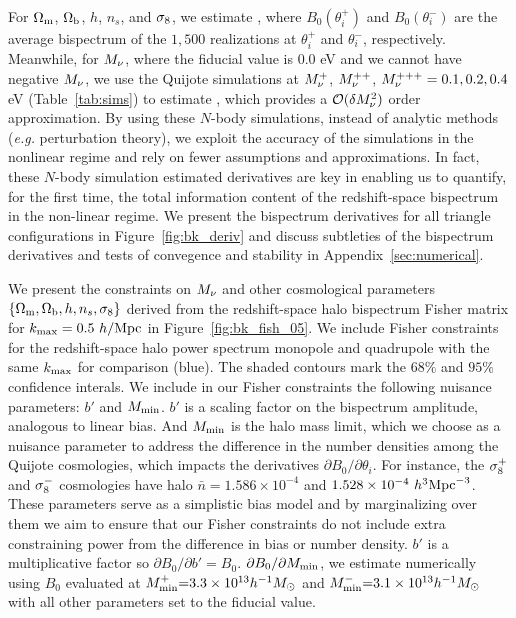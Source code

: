 For $\Omega_{\rm m}$, $\Omega_{\rm b}$, $h$, $n_s$, and $\sigma_8$, we estimate 
\beq \label{eq:dbkdt} 
 \approx {}, 
\eeq
where $B_0(\theta_i^{+})$ and $B_0(\theta_i^{-})$ are the average bispectrum of the 
$1,500$ realizations at $\theta_i^{+}$ and $\theta_i^{-}$, 
respectively. Meanwhile, for $M_\nu$, where the fiducial value is 0.0 eV and we 
cannot have negative $M_\nu$, we use the Quijote simulations at $M_\nu^+$, 
$M_\nu^{++}$, 
$M_\nu^{+++}=0.1, 0.2, 0.4$ eV (Table~\ref{tab:sims}) to estimate 
\beq \label{eq:dbkdmnu} 
 \approx {}, 
\eeq
which provides a $\mathcal{O}(\delta M_\nu^2)$ order approximation. By using these 
$N$-body simulations, instead of analytic methods (\emph{e.g.} perturbation theory), 
we exploit the accuracy of the simulations in the nonlinear regime and rely on fewer 
assumptions and approximations. In fact, these $N$-body simulation estimated 
derivatives are key in enabling us to quantify, for the first time, the total information 
content of the redshift-space bispectrum in the non-linear regime. We present the 
bispectrum derivatives for all triangle configurations in Figure~\ref{fig:bk_deriv} and  
discuss subtleties of the bispectrum derivatives and tests of convegence and stability 
in Appendix~\ref{sec:numerical}. 

We present the constraints on $M_\nu$ and other cosmological parameters 
$\{\Omega_{\rm m}, \Omega_{\rm b}, h, n_s, \sigma_8\}$ derived from the redshift-space halo bispectrum 
Fisher matrix for $k_{\rm max} = 0.5~h/{\rm Mpc}$ in Figure~\ref{fig:bk_fish_05}. 
We include Fisher constraints for the redshift-space halo power spectrum 
monopole and quadrupole with the same $k_{\rm max}$ for comparison (blue). 
The shaded contours mark the $68\%$ and $95\%$ confidence interals. We include 
in our Fisher constraints the following nuisance parameters: $b'$ and $M_{\rm min}$. 
$b'$ is a scaling factor on the bispectrum amplitude, analogous to linear bias. 
And $M_{\rm min}$ is the halo mass limit, which we choose as a nuisance
parameter to address the difference in the number densities among the Quijote
cosmologies, which impacts the derivatives $\partial B_0/\partial \theta_i$. 
For instance, the $\sigma_8^{+}$ and $\sigma_8^{-}$ cosmologies have halo 
$\bar{n} = 1.586\times10^{-4}$ and $1.528 \times 10^{-4}~h^{3}{\rm Mpc}^{-3}$. 
These parameters serve as a simplistic bias model and by marginalizing 
over them we aim to ensure that our Fisher constraints do not include extra 
constraining power from the difference in bias or number density. $b'$ is a 
multiplicative factor so $\partial B_0/\partial b' = B_0$. 
$\partial B_0/\partial M_{\rm min}$, we estimate numerically using 
$B_0$ evaluated at $M^{+}_{\rm min}{=}3.3\times10^{13}h^{-1}M_\odot$ 
and $M^{-}_{\rm min}{=}3.1\times10^{13}h^{-1}M_\odot$ with all other parameters 
set to the fiducial value. 

